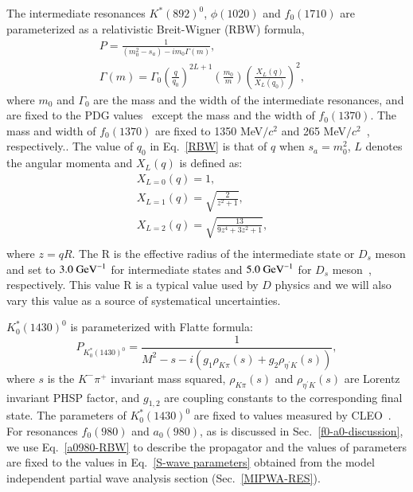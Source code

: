 {{        The intermediate resonances $K^{*}(892)^{0}$, $\phi(1020)$ and  $f_{0}(1710)$ are parameterized as a relativistic Breit-Wigner (RBW) formula,
        \begin{equation}
            \begin{array}{lr}
                P = \frac{1}{(m_{0}^{2} - s_{a} ) - im_{0}\Gamma(m)}, &\\
                \Gamma(m) = \Gamma_{0}\left(\frac{q}{q_{0}}\right)^{2L+1}\left(\frac{m_{0}}{m}\right)\left(\frac{X_{L}(q)}{X_{L}(q_{0})}\right)^{2}, &
            \end{array}\label{RBW} 
        \end{equation}
        where $m_{0}$ and $\Gamma_{0}$ are the mass and the width of the intermediate resonances, and are fixed to the PDG values~\cite{PDG2018} except the mass and the width of $f_{0}(1370)$. 
        The mass and width of $f_{0}(1370)$ are fixed to 1350 MeV$/c^{2}$ and 265 MeV$/c^{2}$~\cite{para-f01370}, respectively..
        The value of $q_{0}$ in Eq.~\ref{RBW} is that of $q$ when $s_{a}=m_{0}^{2}$, $L$ denotes the angular momenta and $X_{L}(q)$ is defined as:
        \begin{equation}
            \begin{array}{lr}
                X_{L=0}(q) = 1,       &\\
                X_{L=1}(q) = \sqrt{\frac{2}{z^{2}+1}},       &\\
                X_{L=2}(q) = \sqrt{\frac{13}{9z^{4}+3z^{2}+1}},       &\\
            \end{array}\label{XLQ} 
        \end{equation}
        where $z=qR$. The R is the effective radius of the intermediate state or $D_{s}$ meson and set to $3.0\ {\rm GeV}^{-1}$ for intermediate states and $5.0\ {\rm GeV}^{-1}$  for $D_{s}$ meson~\cite{Doc-DB-416-v30}, respectively.
        This value R is a typical value used by $D$ physics and we will also vary this value as a source of systematical uncertainties.

        $K^{*}_{0}(1430)^{0}$ is parameterized with Flatte formula:
        \begin{equation}
            P_{K^{*}_{0}(1430)^{0}}= \frac{1}{M^{2} - s - i(g_{1}\rho_{K\pi}(s) + g_{2}\rho_{\eta^{'}K}(s))}, \label{Flatte}
        \end{equation}
        where $s$ is the $K^{-}\pi^{+}$ invariant mass squared,  $\rho_{K\pi}(s)$ and $\rho_{\eta^{'}K}(s)$ are Lorentz invariant PHSP factor, and   $g_{1,2}$ are coupling constants to the corresponding final state. The parameters of $K^{*}_{0}(1430)^{0}$ are fixed to values measured by CLEO~\cite{CLEO-Flatte}. 
        For resonances $f_{0}(980)$ and $a_{0}(980)$, as is discussed in Sec.~\ref{f0-a0-discussion}, we use Eq.~\ref{a0980-RBW} to describe the propagator and the values of parameters are fixed to the values in Eq.~\ref{S-wave parameters} obtained from the model independent partial wave analysis section (Sec.~\ref{MIPWA-RES}).
    }

}
